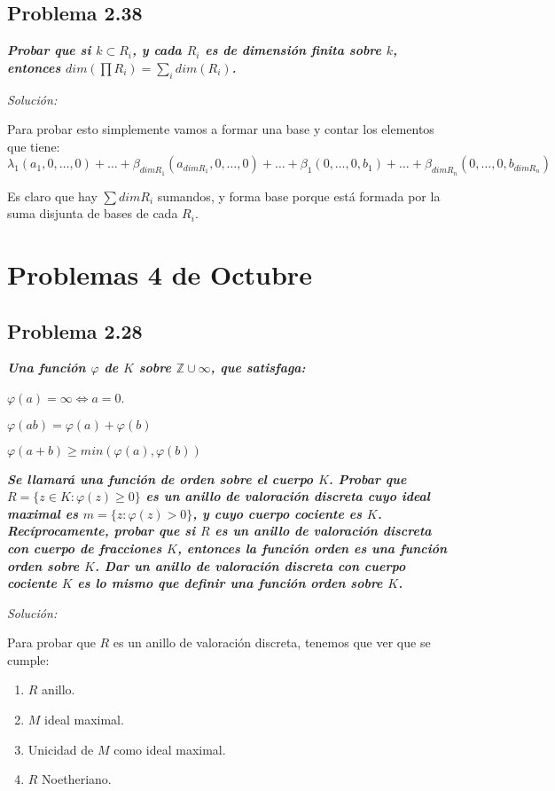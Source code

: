 \subsection{Problema 2.38}

\textit{\textbf{Probar que si $k\subset R_i$, y cada $R_i$ es de dimensión finita sobre $k$, entonces $dim(\prod R_i)=\sum_i dim (R_i)$.}}

\textit{Solución: }

Para probar esto simplemente vamos a formar una base y contar los elementos que tiene:
$$\lambda_1 (a_1,0,\dots,0)+\dots+\beta_{dim R_1}(a_{dim R_1},0,\dots,0)+\dots + \beta_1(0,\dots,0,b_1)+\dots+\beta_{dim R_n}(0,\dots,0,b_{dim R_n})$$

Es claro que hay $\sum dim R_i$ sumandos, y forma base porque está formada por la suma disjunta de bases de cada $R_i$. 
\newpage

\section{Problemas 4 de Octubre}

\subsection{Problema 2.28}

\textit{\textbf{Una función $\varphi$ de $K$ sobre $\mathbb{Z}\cup \infty$, que satisfaga:}}

\begin{itemize*}
\item $\varphi(a) = \infty \Leftrightarrow a = 0$.
\item $\varphi(ab)= \varphi(a)+\varphi(b)$
\item $\varphi(a+b)\ge min(\varphi(a),\varphi(b))$
\end{itemize*}

\textit{\textbf{Se llamará una función de orden sobre el cuerpo $K$. Probar que $R=\{ z\in K : \varphi(z)\ge 0 \}$ es un anillo de valoración discreta cuyo ideal maximal es $m=\{z: \varphi(z)>0\}$, y cuyo cuerpo cociente es $K$. Recíprocamente, probar que si $R$ es un anillo de valoración discreta con cuerpo de fracciones $K$, entonces la función orden es una función orden sobre $K$. Dar un anillo de valoración discreta con cuerpo cociente $K$ es lo mismo que definir una función orden sobre $K$. }}

\textit{Solución:}

Para probar que $R$ es un anillo de valoración discreta, tenemos que ver que se cumple:
\begin{enumerate}
\item $R$ anillo.
\item $M$ ideal maximal.
\item Unicidad de $M$ como ideal maximal.
\item $R$ Noetheriano.
\end{enumerate}

